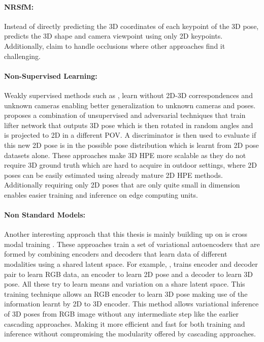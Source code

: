 \paragraph{\ac{NRSfM}:}
Instead of directly predicting the 3D coordinates of each keypoint of the 3D pose, \cite{DistillNRSfM, c3dpo, deepNRSFM, nrsfm++} predicts the 3D shape and camera viewpoint using only 2D keypoints. Additionally, \cite{c3dpo, nrsfm++} claim to handle occlusions where other approaches find it challenging.

\paragraph{Non-Supervised Learning:}
Weakly supervised methods such as \cite{repnet}, learn without 2D-3D correspondences and unknown cameras enabling better generalization to unknown cameras and poses. \cite{amazon1} proposes a combination of unsupervised and adversarial techniques that train lifter network that outputs 3D pose which is then rotated in random angles and is projected to 2D in a different \ac{POV}. A discriminator is then used to evaluate if this new 2D pose is in the possible pose distribution which is learnt from 2D pose datasets alone. These approaches make 3D \ac{HPE} more scalable as they do not require 3D ground truth which are hard to acquire in outdoor settings, where 2D poses can be easily estimated using already mature 2D \ac{HPE} methods. Additionally requiring only 2D poses that are only quite small in dimension enables easier training and inference on edge computing units. 

\paragraph{Non Standard Models:}
Another interesting approach that this thesis is mainly building up on is cross modal training \cite{CrossingNets, crossmodal}. These approaches train a set of variational autoencoders that are formed by combining encoders and decoders that learn data of different modalities using a shared latent space. For example, \cite{crossmodal}, trains encoder and decoder pair to learn \ac{RGB} data, an encoder to learn 2D pose and a decoder to learn 3D pose. All these try to learn means and variation on a share latent space. This training technique allows an \ac{RGB} encoder to learn 3D pose making use of the information learnt by 2D to 3D encoder. This method allows variational inference of 3D poses from \ac{RGB} image without any intermediate step like the earlier cascading approaches. Making it more efficient and fast for both training and inference without compromising the modularity offered by cascading approaches. 






